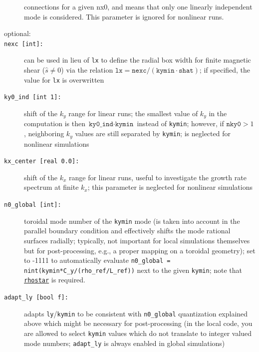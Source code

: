 \documentclass[12pt]{article}
\begin{document}
\begin{description}
  connections for a given nx0, and means that only one linearly independent mode is considered. This parameter 
  is ignored for nonlinear runs.
\item[optional:]
\item[\hypertarget{nexc}{\texttt{nexc [int]:}}] can be used in lieu of \texttt{lx} to define the radial box width for finite
magnetic shear ($\hat s\ne 0$) via the relation $\texttt{lx}=\texttt{nexc}/(\texttt{kymin}\cdot\texttt{shat})$;
if specified, the value for \texttt{lx} is overwritten
\item[\texttt{ky0\_ind [int 1]:}] shift of the $k_y$ range for linear runs; the smallest value of $k_y$ in the computation
is then $\texttt{ky0\_ind}\cdot\texttt{kymin}$ instead of \texttt{kymin}; however, if $\texttt{nky0}>1$, neighboring
$k_y$ values are still separated by \texttt{kymin}; is neglected for nonlinear simulations
\item[\texttt{kx\_center [real 0.0]:}] shift of the $k_x$ range for linear runs, useful to investigate the 
growth rate spectrum at finite $k_x$; this parameter is neglected for nonlinear simulations
\item[\hypertarget{n0\_global}{\texttt{n0\_global [int]:}}] toroidal mode number of the \texttt{kymin} mode (is taken
  into account in the parallel boundary condition and effectively shifts the mode rational surfaces radially; typically, 
  not important for local simulations themselves but for post-processing, e.g., a proper mapping on a toroidal geometry);
  set to -1111 to automatically evaluate {\tt n0\_global = nint(kymin*C\_y/(rho\_ref/L\_ref))} next to the given {\tt kymin};
  note that \hyperlink{rhostar}{\tt rhostar} is required.
\item[\texttt{adapt\_ly [bool f]:}] adapts {\tt ly}/{\tt kymin} to be consistent with {\tt n0\_global} quantization explained
 above which might be necessary for post-processing 
 (in the local code, you are allowed to select {\tt kymin} values which do not translate to integer valued mode 
 numbers; {\tt adapt\_ly} is always enabled in global simulations)
\end{description}
\end{document}
